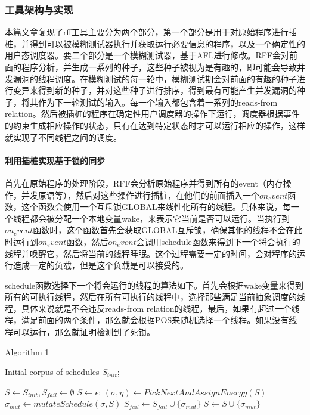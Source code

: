 \subsubsection{工具架构与实现}

本篇文章复现了rff工具主要分为两个部分，第一个部分是用于对原始程序进行插桩，并得到可以被模糊测试器执行并获取运行必要信息的程序，以及一个确定性的用户态调度器。要二个部分是一个模糊测试器，基于AFL进行修改。RFF会对前面的程序分析，并生成一系列的种子，这些种子被视为是有趣的，即可能会导致并发漏洞的线程调度。在模糊测试的每一轮中，模糊测试期会对前面的有趣的种子进行变异来得到新的种子，并对这些种子进行排序，得到最有可能产生并发漏洞的种子，将其作为下一轮测试的输入。每一个输入都包含着一系列的reads-from relation。然后被插桩的程序在确定性用户调度器的操作下运行，调度器根据事件的约束生成相应操作的状态，只有在达到特定状态时才可以运行相应的操作，这样就实现了不同线程之间的调度。

\paragraph{利用插桩实现基于锁的同步}首先在原始程序的处理阶段，RFF会分析原始程序并得到所有的event（内存操作，并发原语等），然后对这些操作进行插桩，在他们的前面插入一个$on_event$函数，这个函数会使用一个互斥锁GLOBAL来线性化所有的线程。具体来说，每一个线程都会被分配一个本地变量wake，来表示它当前是否可以运行。当执行到$on_event$函数时，这个函数首先会获取GLOBAL互斥锁，确保其他的线程不会在此时运行到$on_event$函数，然后$on_event$会调用schedule函数来得到下一个将会执行的线程并唤醒它，然后将当前的线程睡眠。这个过程需要一定的时间，会对程序的运行造成一定的负载，但是这个负载是可以接受的。

schedule函数选择下一个将会运行的线程的算法如下。首先会根据wake变量来得到所有的可执行线程，然后在所有可执行的线程中，选择那些满足当前抽象调度的线程，具体来说就是不会违反reads-from relation的线程，最后，如果有超过一个线程，满足前面的两个条件，那么就会根据POS来随机选择一个线程。如果没有线程可以运行，那么就证明检测到了死锁。

\begin{algorithm}[!ht]
\caption{Algorithm 1}
\label{power}
\begin{algorithmic}[1]
    \REQUIRE  Initial corpus of schedules $S_{init}$; %
    
    \STATE $S \leftarrow S_{init}, S_{fail} \leftarrow \emptyset$
     \STATE $S \leftarrow {\epsilon}$;
    \ENDIF
    \REPEAT
        \STATE $(\sigma, \eta) \leftarrow PickNextAndAssignEnergy(S)$
            \STATE $\sigma_{mut} \leftarrow mutateSchedule(\sigma, S)$
             \STATE $S_{fail} \leftarrow S_{fail} \cup \{\sigma_{mut}\}$
            \ENDIF
             \STATE $S \leftarrow S \cup \{\sigma_{mut}\}$
            \ENDIF
        \ENDFOR
\end{algorithmic}  
\end{algorithm}

